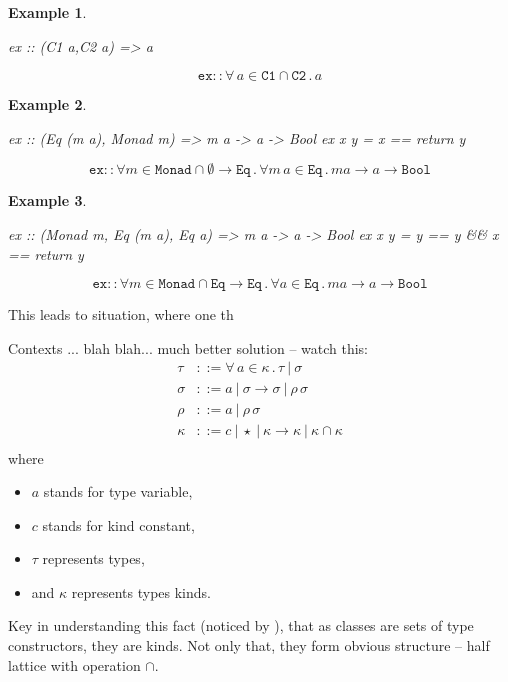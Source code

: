 \documentclass[11pt,oneside,draft]{fithesis2}
\newtheorem{example}{Example}
\begin{document}
\begin{example}~
\begin{code}
ex :: (C1 a,C2 a) => a
\end{code}
\[ \texttt{ex} :: \forall \, a \in \texttt{C1} \cap \texttt{C2} \, . \, a \]
\end{example}
 
\begin{example}~
\begin{code}
ex :: (Eq (m a), Monad m) => m a -> a -> Bool
ex x y = x == return y
\end{code}
\[ \texttt{ex} :: \forall m \in \texttt{Monad} \cap \emptyset \to \texttt{Eq} \, . \, \forall m \, a \in \texttt{Eq} \, . \, m a \to a \to \texttt{Bool} \]
\end{example}

\begin{example}~
\begin{code}
ex :: (Monad m, Eq (m a), Eq a) => m a -> a -> Bool
ex x y = y == y && x == return y
\end{code}
\[ \texttt{ex} :: \forall m \in \texttt{Monad} \cap \texttt{Eq} \to \texttt{Eq} \, . \, \forall a \in \texttt{Eq} \, . \, m a \to a \to \texttt{Bool} \]
\end{example}

This leads to situation, where one th

Contexts ... blah blah... much better solution -- watch this:
\begin{align*}
	\tau   & ::= \forall \, a \in \kappa \, . \, \tau ~|~ \sigma \\
	\sigma & ::= a ~|~ \sigma \to \sigma ~|~ \rho \, \sigma \\
	\rho   & ::= a ~|~ \rho \, \sigma \\
	\kappa & ::= c ~|~ \star ~|~ \kappa \to \kappa ~|~ \kappa \cap \kappa \\
\end{align*}
where
\begin{itemize}
	\item \(a\) stands for type variable,
	\item \(c\) stands for kind constant,
	\item \(\tau\) represents types,
	\item and \(\kappa\) represents types kinds.
\end{itemize}

Key in understanding this fact (noticed by \cite{libor}),
that as classes are sets of type constructors, they are kinds.
Not only that, they form obvious structure -- half lattice with operation
\(\cap\).
\end{document}
